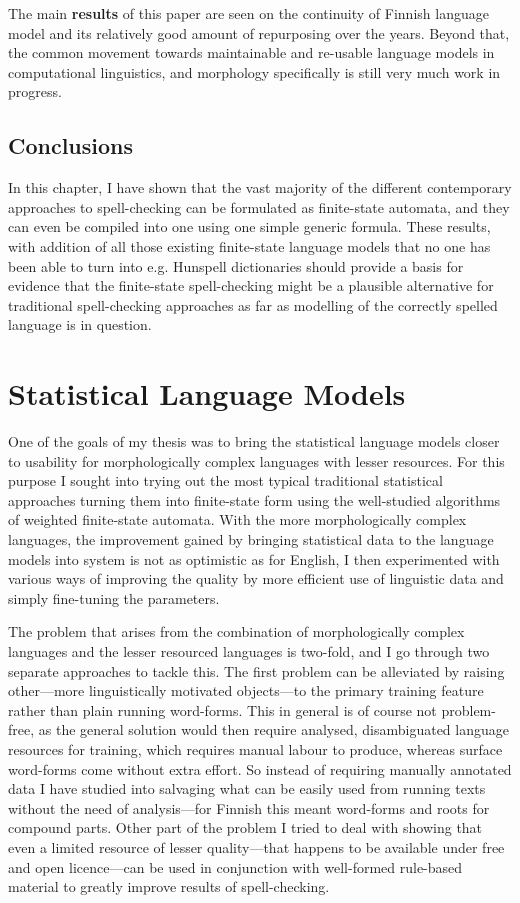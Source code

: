 \documentclass[officiallayout,draft]{unihelcompling}
\begin{document}
The main \textbf{results} of this paper are seen on the continuity of Finnish
language model and its relatively good amount of repurposing over the years.
Beyond that, the common movement towards maintainable and re-usable language
models in computational linguistics, and morphology specifically is still very
much work in progress.

\section{Conclusions}

In this chapter, I have shown that the vast majority of the different
contemporary approaches to spell-checking can be formulated as finite-state
automata, and they can even be compiled into one using one simple generic
formula. These results, with addition of all those existing finite-state
language models that no one has been able to turn into e.g. Hunspell
dictionaries should provide a basis for evidence that the finite-state
spell-checking might be a plausible alternative for traditional spell-checking
approaches as far as modelling of the correctly spelled language is in
question.

\chapter{Statistical Language Models}
\label{chap:statistical-models}

One of the goals of my thesis was to bring the statistical language models
closer to usability for morphologically complex languages with lesser
resources. For this purpose I sought into trying out the most typical
traditional statistical approaches turning them into finite-state form
using the well-studied algorithms of weighted finite-state automata. With the
more morphologically complex languages, the improvement gained by bringing
statistical data to the language models into system is not as optimistic as
for English, I then experimented with various ways of improving the quality
by more efficient use of linguistic data and simply fine-tuning the parameters.

The problem that arises from the combination of morphologically complex
languages and the lesser resourced languages is two-fold, and I go through two
separate approaches to tackle this. The first problem can be alleviated by
raising other---more linguistically motivated objects---to the primary training
feature rather than plain running word-forms. This in general is of course not
problem-free, as the general solution would then require analysed,
disambiguated language resources for training, which requires manual labour to
produce, whereas surface word-forms come without extra effort. So instead of
requiring manually annotated data I have studied into salvaging what can be
easily used from running texts without the need of analysis---for Finnish
this meant word-forms and roots for compound parts. Other part of the problem I
tried to deal with showing that even a limited resource of lesser
quality---that happens to be available under free and open licence---can be
used in conjunction with well-formed rule-based material to greatly improve
results of spell-checking.
\end{document}
